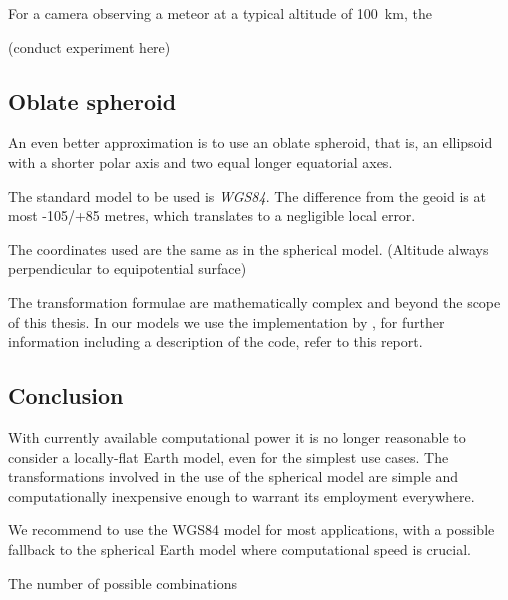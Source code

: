         For a camera observing a meteor at a typical altitude of \SI{100}{\kilo\metre},
        the 

        (conduct experiment here)


    \subsection{Oblate spheroid} \label{mmw}
        An even better approximation is to use an oblate spheroid,
        that is, an ellipsoid with a shorter polar axis and two
        equal longer equatorial axes.

        The standard model to be used is \emph{WGS84}.
        The difference from the geoid is at most -105/+85 metres,
        which translates to a negligible local error.

        The coordinates used are the same as in the spherical model. (Altitude always perpendicular to equipotential surface)

        The transformation formulae are mathematically complex and beyond the scope of this thesis.
        In our models we use the implementation by \cite{osen2017},
        for further information including a description of the code, refer to this report.

    \subsection{Conclusion}
        With currently available computational power it is no longer reasonable to
        consider a locally-flat Earth model, even for the simplest use cases.
        The transformations involved in the use of the spherical model
        are simple and computationally inexpensive enough to warrant its employment everywhere.

        We recommend to use the WGS84 model for most applications, with a possible
        fallback to the spherical Earth model where computational speed is crucial.


The number of possible combinations


